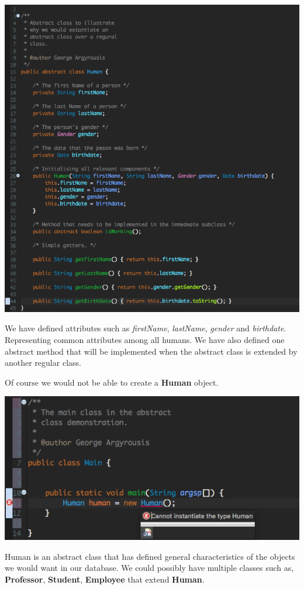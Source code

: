 \documentclass{article}
\begin{document}
            \includegraphics[scale=0.48]{images/Human.png}

            We have defined attributes such as \textit{firstName}, \textit{lastName}, \textit{gender} and \textit{birthdate}. Representing common attributes among all humans. We have also defined one abstract method that will be implemented when the abstract class is extended by another regular class.

            Of course we would not be able to create a \textbf{Human} object.

            \includegraphics[scale=0.7]{images/Main_error.png}

            Human is an abstract class that has defined general characteristics of the objects we would want in our database. We could possibly have multiple classes such as, \textbf{Professor}, \textbf{Student}, \textbf{Employee} that extend \textbf{Human}.
\end{document}
